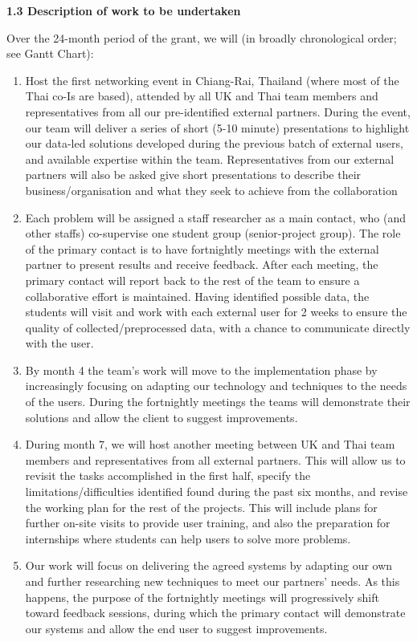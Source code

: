 \documentclass[11pt]{article}
\begin{document}
  \noindent
  {\large \bf 1.3 Description of work to be undertaken}
  
  \noindent
  Over the 24-month period of the grant, we will (in broadly chronological order; see Gantt Chart):
  \begin{enumerate}[leftmargin=6mm,itemsep=-3pt,topsep=1pt]
  \item Host the first networking event in Chiang-Rai, Thailand (where most of the Thai co-Is are based), attended by all UK and Thai team members and representatives from all our pre-identified external partners. During the event, our team will deliver a series of short (5-10 minute) presentations to highlight our data-led solutions developed during the previous batch of external users, and available expertise within the team. Representatives from our external partners will also be asked give short presentations to describe their business/organisation and what they seek to achieve from the collaboration
  \item Each problem will be assigned a staff researcher as a main contact, who (and other staffs) co-supervise one student group (senior-project group). The role of the primary contact is to have fortnightly meetings with the external partner to present results and receive feedback. After each meeting, the primary contact will report back to the rest of the team to ensure a collaborative effort is maintained. Having identified possible data, the students will visit and work with each external user for 2 weeks to ensure the quality of collected/preprocessed data, with a chance to communicate directly with the user.
  \item By month 4 the team’s work will move to the implementation phase by increasingly focusing on adapting our technology and techniques to the needs of the users. During the fortnightly meetings the teams will demonstrate their solutions and allow the client to suggest improvements.
  \item During month 7, we will host another meeting between UK and Thai team members and representatives from all external partners. This will allow us to revisit the tasks accomplished in the first half, specify the limitations/difficulties identified found during the past six months, and revise the working plan for the rest of the projects. This will include plans for further on-site visits to provide user training, and also the preparation for internships where students can help users to solve more problems.
  \item Our work will focus on delivering the agreed systems by adapting our own and further researching new techniques to meet our partners' needs. As this happens, the purpose of the fortnightly meetings will progressively shift toward feedback sessions, during which the primary contact will demonstrate our systems and allow the end user to suggest improvements. 

\end{enumerate}
\end{document}
